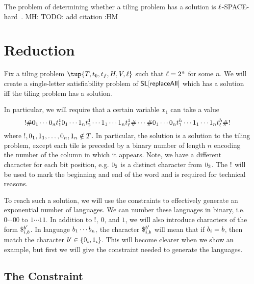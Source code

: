 \documentclass{article}
\newcommand{\mat}[1]{\color{cyan} {MH: #1 :HM} \color{black}}
\begin{document}
The problem of determining whether a tiling problem has a solution is $\width$-SPACE-hard~\cite{TODO}.
\mat{TODO: add citation}


\section{Reduction}

Fix a tiling problem
$\tup{\tiles, \inittile, \fintile, \hcons, \vcons, \width}$
such that
$\width = 2^n$
for some $n$.
We will create a single-letter satisfiability problem of $\strline[\replaceall]$ which has a solution iff the tiling problem has a solution.

In particular, we will require that a certain variable $x_1$ can take a value
\[
    \resetchar
    \rowdelim \nbit{1}{0} \cdots \nbit{n}{0} \tile^1_1
              \nbit{1}{0} \cdots \nbit{n}{1} \tile^1_2
              \cdots
              \nbit{1}{1} \cdots \nbit{n}{1} \tile^1_\width
    \rowdelim \cdots
    \rowdelim \nbit{1}{0} \cdots \nbit{n}{0} \tile^\height_1
              \cdots
              \nbit{1}{1} \cdots \nbit{n}{1} \tile^\height_\width
    \rowdelim
    \resetchar
\]
where
$\resetchar,
 \nbit{1}{0}, \nbit{1}{1},
 \ldots,
 \nbit{n}{0}, \nbit{n}{1} \notin \tiles$.
In particular, the solution is a solution to the tiling problem, except each tile is preceded by a binary number of length $n$ encoding the number of the column in which it appears.
Note, we have a different character for each bit position, e.g. $\nbit{2}{0}$ is a distinct character from $\nbit{3}{0}$.
The $\resetchar$ will be used to mark the beginning and end of the word and is required for technical reasons.

To reach such a solution, we will use the constraints to effectively generate an exponential number of languages.
We can number these languages in binary, i.e.\ $0\cdots00$ to $1\cdots11$.
In addition to $\resetchar$, $0$, and $1$, we will also introduce characters of the form
$\repl{i}{\bit}{\bit'}$.
In language
$\bit_1\cdots\bit_n$,
the character
$\repl{i}{\bit}{\bit'}$
will mean that if $\bit_i = \bit$, then match the character
$\bit' \in \set{\nbit{i}{0},\nbit{i}{1}}$.
This will become clearer when we show an example, but first we will give the constraint needed to generate the languages.

\subsection*{The Constraint}
\end{document}

